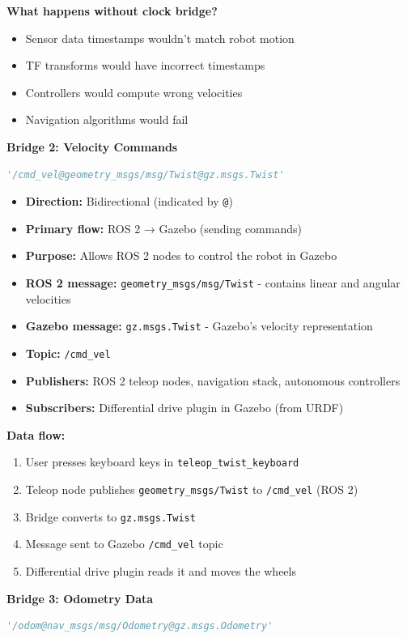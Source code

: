\textbf{What happens without clock bridge?}
\begin{itemize}
	\item Sensor data timestamps wouldn't match robot motion
	\item TF transforms would have incorrect timestamps
	\item Controllers would compute wrong velocities
	\item Navigation algorithms would fail
\end{itemize}

\textbf{Bridge 2: Velocity Commands}
\begin{lstlisting}[language=Python]
'/cmd_vel@geometry_msgs/msg/Twist@gz.msgs.Twist'
\end{lstlisting}

\begin{itemize}
	\item \textbf{Direction:} Bidirectional (indicated by \texttt{@})
	\item \textbf{Primary flow:} ROS 2 → Gazebo (sending commands)
	\item \textbf{Purpose:} Allows ROS 2 nodes to control the robot in Gazebo
	\item \textbf{ROS 2 message:} \texttt{geometry\_msgs/msg/Twist} - contains linear and angular velocities
	\item \textbf{Gazebo message:} \texttt{gz.msgs.Twist} - Gazebo's velocity representation
	\item \textbf{Topic:} \texttt{/cmd\_vel}
	\item \textbf{Publishers:} ROS 2 teleop nodes, navigation stack, autonomous controllers
	\item \textbf{Subscribers:} Differential drive plugin in Gazebo (from URDF)
\end{itemize}

\textbf{Data flow:}
\begin{enumerate}
	\item User presses keyboard keys in \texttt{teleop\_twist\_keyboard}
	\item Teleop node publishes \texttt{geometry\_msgs/Twist} to \texttt{/cmd\_vel} (ROS 2)
	\item Bridge converts to \texttt{gz.msgs.Twist}
	\item Message sent to Gazebo \texttt{/cmd\_vel} topic
	\item Differential drive plugin reads it and moves the wheels
\end{enumerate}

\textbf{Bridge 3: Odometry Data}
\begin{lstlisting}[language=Python]
'/odom@nav_msgs/msg/Odometry@gz.msgs.Odometry'
\end{lstlisting}

